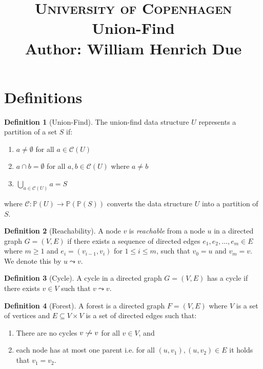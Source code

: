 \documentclass[a4paper,12pt]{article}
\title{
    {\Large \textsc{University of Copenhagen}} \\[5pt]
    {\large Union-Find} \\[10pt]
    Author: William Henrich Due \\[0pt]
}
\author{}
\date{}
\theoremstyle{definition}
\newtheorem{definition}{Definition}[section]
\begin{document}
\maketitle
\thispagestyle{firstpage}

\section{Definitions}

\begin{definition}[Union-Find]\label{def:union-find} The
    union-find data structure $U$ represents a partition of a set $S$ if:
    \begin{enumerate}
        \item $a \neq \emptyset$ for all $a \in \mathcal{C}(U)$
        \item $a \cap b = \emptyset$ for all $a, b \in \mathcal{C}(U)$ where $a
        \neq b$
        \item $\bigcup_{a \in \mathcal{C}(U)} a = S$
    \end{enumerate}
    where $\mathcal{C} : \mathbb{P}(U) \to \mathbb{P}(\mathbb{P}(S))$ converts
    the data structure $U$ into a partition of $S$.
\end{definition}

\begin{definition}[Reachability]
    A node $v$ is \emph{reachable} from a node $u$ in a directed graph $G = (V,
    E)$ if there exists a sequence of directed edges $e_1, e_2, \ldots, e_m \in
    E$ where $m \geq 1$ and $e_i = (v_{i-1}, v_i)$ for $1 \leq i \leq m$,
    such that $v_0 = u$ and $v_m = v$. We denote this by $u \leadsto v$.
\end{definition}

\begin{definition}[Cycle]
    A cycle in a directed graph $G = (V, E)$ has a cycle if there exists
    $v \in V$ such that $v \leadsto v$.
\end{definition}

\begin{definition}[Forest]
    A forest is a directed graph $F = (V, E)$ where $V$ is a set of vertices and $E
    \subseteq V \times V$ is a set of directed edges such that:
    \begin{enumerate}
        \item There are no cycles $v \centernot\leadsto v$ for all $v \in V$, and
        \item each node has at most one parent i.e. for all $(u, v_1), (u, v_2)
        \in E$ it holds that $v_1 = v_2$.
    \end{enumerate}
\end{definition}
\end{document}
